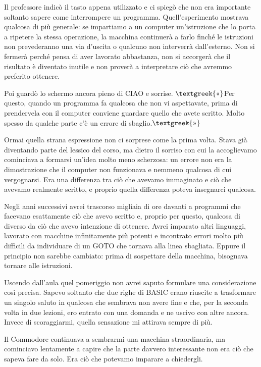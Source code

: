 \documentclass{article}
\begin{document}
Il professore indicò il tasto appena utilizzato e ci spiegò che non era importante soltanto sapere come interrompere un
programma. Quell'esperimento mostrava qualcosa di più generale: se impartiamo a un computer un'istruzione che lo porta
a ripetere la stessa operazione, la macchina continuerà a farlo finché le istruzioni non prevederanno una via d'uscita
o qualcuno non interverrà dall'esterno. Non si fermerà perché pensa di aver lavorato abbastanza, non si accorgerà che
il risultato è diventato inutile e non proverà a interpretare ciò che avremmo preferito ottenere.

Poi guardò lo schermo ancora pieno di CIAO e sorrise. $\text{\textgreek{«}}$Per questo, quando un programma fa qualcosa
che non vi aspettavate, prima di prendervela con il computer conviene guardare quello che avete scritto. Molto spesso
da qualche parte c'è un errore di sbaglio.$\text{\textgreek{»}}$

Ormai quella strana espressione non ci sorprese come la prima volta. Stava già diventando parte del lessico del corso,
ma dietro il sorriso con cui la accoglievamo cominciava a formarsi un'idea molto meno scherzosa: un errore non era la
dimostrazione che il computer non funzionava e nemmeno qualcosa di cui vergognarsi. Era una differenza tra ciò che
avevamo immaginato e ciò che avevamo realmente scritto, e proprio quella differenza poteva insegnarci qualcosa.

Negli anni successivi avrei trascorso migliaia di ore davanti a programmi che facevano esattamente ciò che avevo scritto
e, proprio per questo, qualcosa di diverso da ciò che avevo intenzione di ottenere. Avrei imparato altri linguaggi,
lavorato con macchine infinitamente più potenti e incontrato errori molto più difficili da individuare di un GOTO che
tornava alla linea sbagliata. Eppure il principio non sarebbe cambiato: prima di sospettare della macchina, bisognava
tornare alle istruzioni.

Uscendo dall'aula quel pomeriggio non avrei saputo formulare una considerazione così precisa. Sapevo soltanto che due
righe di BASIC erano riuscite a trasformare un singolo saluto in qualcosa che sembrava non avere fine e che, per la
seconda volta in due lezioni, ero entrato con una domanda e ne uscivo con altre ancora. Invece di scoraggiarmi, quella
sensazione mi attirava sempre di più.

Il Commodore continuava a sembrarmi una macchina straordinaria, ma cominciavo lentamente a capire che la parte davvero
interessante non era ciò che sapeva fare da solo. Era ciò che potevamo imparare a chiedergli.


\bigskip
\end{document}

